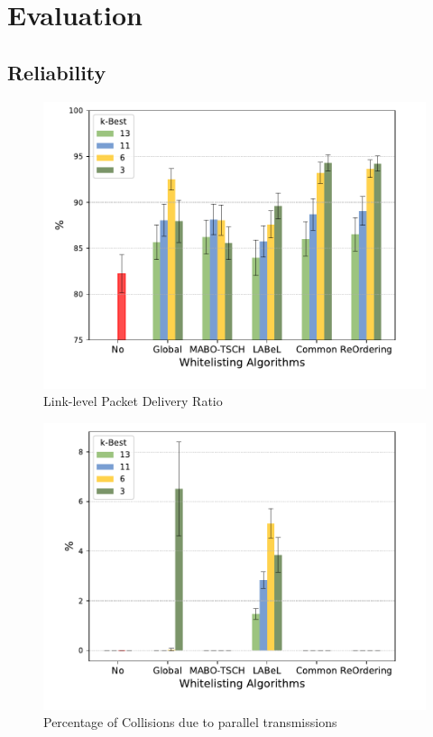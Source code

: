 \documentclass{article}
\begin{document}
\section{Evaluation}
\subsection{Reliability}

\begin{figure}
\centering
	\includegraphics[width=0.99\linewidth]{graphs/PRR}
	\caption{Link-level Packet Delivery Ratio}
	\label{fig:PRR}
\end{figure}

\begin{figure}
\centering
	\includegraphics[width=0.99\linewidth]{graphs/collisions}
	\caption{Percentage of Collisions due to parallel transmissions}
	\label{fig:collisions}
\end{figure}
\end{document}

